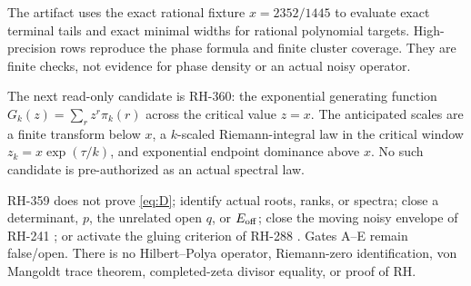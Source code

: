 \documentclass[11pt]{article}
\theoremstyle{remark}
\begin{document}
The artifact uses the exact rational fixture $x=2352/1445$ to evaluate exact
terminal tails and exact minimal widths for rational polynomial targets.
High-precision rows reproduce the phase formula and finite cluster coverage.
They are finite checks, not evidence for phase density or an actual noisy
operator.

The next read-only candidate is RH-360: the exponential generating function
$G_k(z)=\sum_r z^r\pi_k(r)$ across the critical value $z=x$.  The anticipated
scales are a finite transform below $x$, a $k$-scaled Riemann-integral law in
the critical window $z_k=x\exp(\tau/k)$, and exponential endpoint dominance
above $x$.  No such candidate is pre-authorized as an actual spectral law.

RH-359 does not prove \eqref{eq:D}; identify actual roots, ranks, or spectra;
close a determinant, $p$, the unrelated open $q$, or $E_{\rm off}$; close the
moving noisy envelope of RH-241 \citep{WangEnvelopeReview2026}; or activate
the gluing criterion of RH-288 \citep{WangGluing2026}.  Gates A--E remain
false/open.  There is no Hilbert--Polya operator, Riemann-zero identification,
von Mangoldt trace theorem, completed-zeta divisor equality, or proof of RH.



\end{document}
